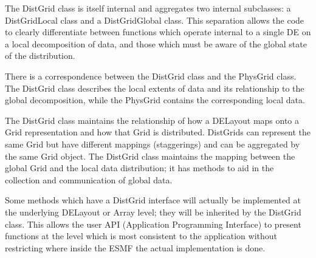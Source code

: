 



The DistGrid class is itself internal and aggregates two internal
subclasses: a DistGridLocal class and a DistGridGlobal class.  This
separation allows the code to clearly differentiate between functions which
operate internal to a single DE on a local decomposition of data, and those
which must be aware of the global state of the distribution.

There is a correspondence between the DistGrid class and the PhysGrid
class.  The DistGrid class describes the local extents of data and
its relationship to the global decomposition, while the PhysGrid contains 
the corresponding local data.  

The DistGrid class maintains the relationship of how a DELayout maps onto
a Grid representation and how that Grid is distributed.  DistGrids can
represent the same Grid but have different mappings (staggerings) and can
be aggregated by the same Grid object. The DistGrid class maintains the
mapping between the global Grid and the local data distribution;  it has
methods to aid in the collection and communication of global data.  

Some methods which have a DistGrid interface will actually be
implemented at the underlying DELayout or Array level; they
will be inherited by the DistGrid class.  This allows the user
API (Application Programming Interface) to present functions at
the level which is most consistent to the application without
restricting where inside the ESMF the actual implementation
is done.
